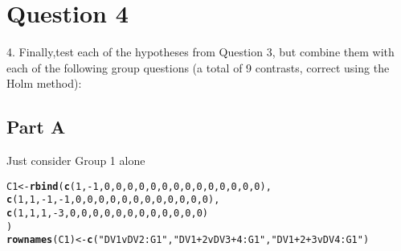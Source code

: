 \documentclass{article}\usepackage[]{graphicx}\usepackage[]{color}
\makeatletter
\newcommand{\hlnum}[1]{\textcolor[rgb]{0.686,0.059,0.569}{#1}}%
\newcommand{\hlstr}[1]{\textcolor[rgb]{0.192,0.494,0.8}{#1}}%
\newcommand{\hlopt}[1]{\textcolor[rgb]{0,0,0}{#1}}%
\newcommand{\hlstd}[1]{\textcolor[rgb]{0.345,0.345,0.345}{#1}}%
\newcommand{\hlkwb}[1]{\textcolor[rgb]{0.69,0.353,0.396}{#1}}%
\newcommand{\hlkwd}[1]{\textcolor[rgb]{0.737,0.353,0.396}{\textbf{#1}}}%
\newenvironment{kframe}{%
 \def\at@end@of@kframe{}%
 \ifinner\ifhmode%
  \def\at@end@of@kframe{\end{minipage}}%
  \begin{minipage}{\columnwidth}%
 \fi\fi%
 \def\FrameCommand##1{\hskip\@totalleftmargin \hskip-\fboxsep
 \colorbox{shadecolor}{##1}\hskip-\fboxsep
     \hskip-\linewidth \hskip-\@totalleftmargin \hskip\columnwidth}%
 \MakeFramed {\advance\hsize-\width
   \@totalleftmargin\z@ \linewidth\hsize
   \@setminipage}}%
 {\par\unskip\endMakeFramed%
 \at@end@of@kframe}
\newenvironment{knitrout}{}{} %
\makeatother
\begin{document}
\section{Question 4}
4. Finally,test each of the hypotheses from Question 3, but combine them with each of the following group questions (a total of 9 contrasts, correct using the Holm method): 

\subsection{Part A}
Just consider Group 1 alone
\begin{knitrout}
\color{fgcolor}\begin{kframe}
\begin{alltt}
\hlstd{C1} \hlkwb{<-} \hlkwd{rbind}\hlstd{(}\hlkwd{c}\hlstd{(} \hlnum{1}\hlstd{,}\hlopt{-}\hlnum{1}\hlstd{,}  \hlnum{0}\hlstd{,}  \hlnum{0}\hlstd{,} \hlnum{0}\hlstd{,}\hlnum{0}\hlstd{,}\hlnum{0}\hlstd{,}\hlnum{0}\hlstd{,} \hlnum{0}\hlstd{,}\hlnum{0}\hlstd{,}\hlnum{0}\hlstd{,}\hlnum{0}\hlstd{,} \hlnum{0}\hlstd{,}\hlnum{0}\hlstd{,}\hlnum{0}\hlstd{,}\hlnum{0}\hlstd{),}
      \hlkwd{c}\hlstd{(}\hlnum{1}\hlstd{,}\hlnum{1}\hlstd{,}\hlopt{-}\hlnum{1}\hlstd{,}\hlopt{-}\hlnum{1}\hlstd{,} \hlnum{0}\hlstd{,}\hlnum{0}\hlstd{,}\hlnum{0}\hlstd{,}\hlnum{0}\hlstd{,} \hlnum{0}\hlstd{,}\hlnum{0}\hlstd{,}\hlnum{0}\hlstd{,}\hlnum{0}\hlstd{,} \hlnum{0}\hlstd{,}\hlnum{0}\hlstd{,}\hlnum{0}\hlstd{,}\hlnum{0}\hlstd{),}
      \hlkwd{c}\hlstd{(}\hlnum{1}\hlstd{,}\hlnum{1}\hlstd{,} \hlnum{1}\hlstd{,} \hlopt{-}\hlnum{3}\hlstd{,} \hlnum{0}\hlstd{,}\hlnum{0}\hlstd{,}\hlnum{0}\hlstd{,}\hlnum{0}\hlstd{,} \hlnum{0}\hlstd{,}\hlnum{0}\hlstd{,}\hlnum{0}\hlstd{,}\hlnum{0}\hlstd{,} \hlnum{0}\hlstd{,}\hlnum{0}\hlstd{,}\hlnum{0}\hlstd{,}\hlnum{0}\hlstd{)}
\hlstd{)}
\hlkwd{rownames}\hlstd{(C1)} \hlkwb{<-} \hlkwd{c}\hlstd{(}\hlstr{"DV1vDV2:G1"}\hlstd{,} \hlstr{"DV1+2vDV3+4:G1"}\hlstd{,} \hlstr{"DV1+2+3vDV4:G1"}\hlstd{)}
\end{alltt}
\end{kframe}
\end{knitrout}
\end{document}
